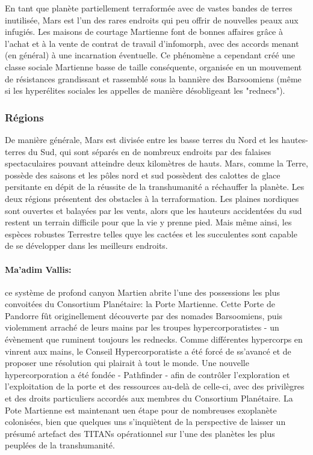 En tant que planète partiellement terraformée avec de vastes bandes de terres inutilisée, Mars est l'un des rares endroits qui peu offrir de nouvelles peaux aux infugiés. Les maisons de courtage Martienne font de bonnes affaires grâce à l'achat et à la vente de contrat de travail d'infomorph, avec des accords menant (en général) à une incarnation éventuelle. Ce phénomène a cependant créé une classe sociale Martienne basse de taille conséquente, organisée en un mouvement de résistances grandissant et rassemblé sous la bannière des Barsoomiens (même si les hyperélites sociales les appelles de manière désobligeant les "rednecs"). 

\subsubsection{Régions} \label{sec:regions} 

De manière générale, Mars est divisée entre les basse terres du Nord et les hautes-terres du Sud, qui sont séparés en de nombreux endroits par des falaises spectaculaires pouvant atteindre deux kilomètres de hauts. Mars, comme la Terre, possède des saisons et les pôles nord et sud possèdent des calottes de glace persitante en dépit de la réussite de la transhumanité a réchauffer la planète. Les deux régions présentent des obstacles à la terraformation. Les plaines nordiques sont ouvertes et balayées par les vents, alors que les hauteurs accidentées du sud restent un terrain difficile pour que la vie y prenne pied. Mais même ainsi, les espèces robustes Terrestre telles quye les cactées et les succulentes sont capable de se développer dans les meilleurs endroits. 

\paragraph{Ma'adim Vallis:} \label{sec:maadim-vallis} ce système de profond canyon Martien abrite l'une des possessions les plus convoitées du Consortium Planétaire: la Porte Martienne. Cette Porte de Pandorre fût originellement découverte par des nomades Barsoomiens, puis violemment arraché de leurs mains par les troupes hypercorporatistes - un évènement que ruminent toujours les rednecks. Comme différentes hypercorps en vinrent aux mains, le Conseil Hypercorporatiste a été forcé de ss'avancé et de proposer une résolution qui plairait à tout le monde. Une nouvelle hypercorporation a été fondée - Pathfinder - afin de contrôler l'exploration et l'exploitation de la porte et des ressources au-delà de celle-ci, avec des privilègres et des droits particuliers accordés aux membres du Consortium Planétaire. La Pote Martienne est maintenant uen étape pour de nombreuses exoplanète colonisées, bien que quelques uns s'inquiètent de la perspective de laisser un présumé artefact des TITANs opérationnel sur l'une des planètes les plus peuplées de la transhumanité. 

